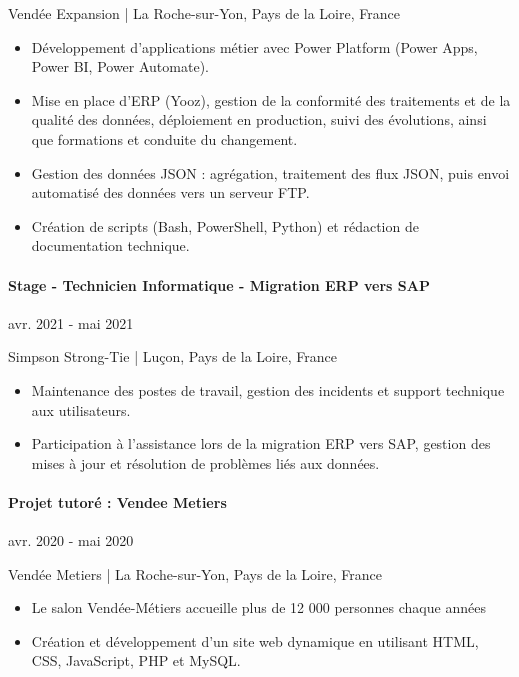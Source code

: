 \documentclass{article}
\begin{document}
\noindent
Vendée Expansion | La Roche-sur-Yon, Pays de la Loire, France

\raggedright
\begin{itemize}
  \item Développement d'applications métier avec Power Platform (Power Apps, Power BI, Power Automate).
  \item Mise en place d'ERP (Yooz), gestion de la conformité des traitements et de la qualité des données, déploiement en production, suivi des évolutions, ainsi que formations et conduite du changement.
  \item Gestion des données JSON : agrégation, traitement des flux JSON, puis envoi automatisé des données vers un serveur FTP.
  \item Création de scripts (Bash, PowerShell, Python) et rédaction de documentation technique.
\end{itemize}


\paragraph{Stage - Technicien Informatique - Migration ERP vers SAP}\hspace*{\fill}avr. 2021 - mai 2021

\noindent
Simpson Strong-Tie | Luçon, Pays de la Loire, France

\raggedright  
\begin{itemize}
  \item{Maintenance des postes de travail, gestion des incidents et support technique aux utilisateurs.}
  \item{Participation à l'assistance lors de la migration ERP vers SAP, gestion des mises à jour et résolution de problèmes liés aux données.}
\end{itemize}

\paragraph{Projet tutoré : Vendee Metiers}\hspace*{\fill}avr. 2020 - mai 2020

\noindent
Vendée Metiers | La Roche-sur-Yon, Pays de la Loire, France

\raggedright  
\begin{itemize}
  \item{Le salon Vendée-Métiers accueille plus de 12 000 personnes chaque années}
  \item{Création et développement d'un site web dynamique en utilisant HTML, CSS, JavaScript, PHP et MySQL.}
\end{itemize}
\end{document}
